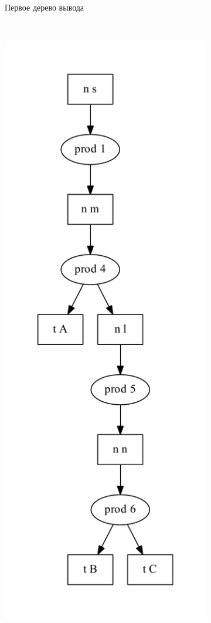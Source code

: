 \begin{figure}[h!]
\begin{subfigure}[b]{0.3\textwidth}
       \caption{Первое дерево вывода}
       \label{fig:ex_sppf1}
   \end{subfigure}
   ~ 
   \begin{subfigure}[b]{0.3\textwidth}
       \includegraphics[width=\textwidth]{pics/ex_sppf2}

\end{subfigure}
\end{figure}
